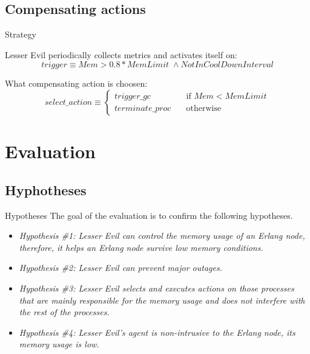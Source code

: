 \documentclass{beamer}
\begin{document}
\subsection{Compensating actions}
\begin{frame}{Strategy}

Lesser Evil periodically collects metrics and activates itself on:
$$
\mathit{trigger}  \equiv \mathit{Mem} > 0.8 * \mathit{MemLimit}  \;\wedge \mathit{NotInCoolDownInterval}
$$

What compensating action is choosen:
$$
\mathit{select\_action}  \equiv \begin{cases}
    \mathit{trigger\_gc}       & \quad \text{if } \mathit{Mem} < \mathit{MemLimit} \\
    \mathit{terminate\_proc}  & \quad \text{otherwise}
  \end{cases}
$$

\end{frame}




\section{Evaluation}
\subsection{Hyphotheses}
\begin{frame}{Hypotheses}
The goal of the evaluation is to confirm the following hypotheses.
\begin{itemize}

\item \emph{Hypothesis \#1: Lesser Evil can control the memory usage of an Erlang node, therefore, it helps an Erlang node survive low memory conditions.}
\item \emph{Hypothesis \#2: Lesser Evil can prevent major outages.}
\item \emph{Hypothesis \#3: Lesser Evil selects and executes actions on those processes that are mainly responsible for the memory usage and does not interfere with the rest of the processes.}
\item \emph{Hypothesis \#4: Lesser Evil's agent is non-intrusive to the Erlang node, its memory usage is low.}

\end{itemize}
\end{frame}
\end{document}
